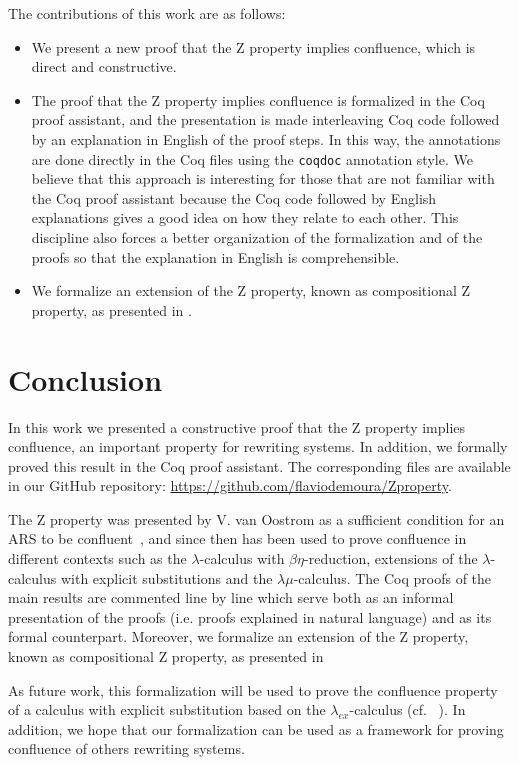 \documentclass{llncs}
\begin{document}
The contributions of this work are as follows:
\begin{itemize}
\item We present a new proof that the Z property implies confluence, which is direct and constructive.
\item The proof that the Z property implies confluence is formalized in the Coq proof assistant\cite{teamCoqProofAssistant2024}, and the presentation is made interleaving Coq code followed by an explanation in English of the proof steps. In this way, the annotations are done directly in the Coq files using the {\tt coqdoc} annotation style. We believe that this approach is interesting for those that are not familiar with the Coq proof assistant because the Coq code followed by English explanations gives a good idea on how they relate to each other. This discipline also forces a better organization of the formalization and of the proofs so that the explanation in English is comprehensible.
\item We formalize an extension of the Z property, known as compositional Z property, as presented in \cite{Nakazawa-Fujita2016}.
\end{itemize}




\section{Conclusion}

In this work we presented a constructive proof that the Z property
implies confluence, an important property for rewriting systems. In
addition, we formally proved this result in the Coq proof
assistant. The corresponding files are available in our GitHub
repository: \url{https://github.com/flaviodemoura/Zproperty}.

The Z property was presented by V. van Oostrom as a sufficient
condition for an ARS to be confluent~\cite{zproperty}, and since
then has been used to prove confluence in different contexts such as
the $\lambda$-calculus with $\beta\eta$-reduction, extensions of the
$\lambda$-calculus with explicit substitutions and the
$\lambda\mu$-calculus. The Coq proofs of the main results are
commented line by line which serve both as an informal presentation of
the proofs (i.e. proofs explained in natural language) and as its
formal counterpart. Moreover, we formalize an extension of the Z
property, known as compositional Z property, as presented in
\cite{Nakazawa-Fujita2016}

As future work, this formalization will be used to prove the
confluence property of a calculus with explicit substitution based on
the $\lambda_{ex}$-calculus (cf. ~\cite{kes09}). In addition, we hope
that our formalization can be used as a framework for proving
confluence of others rewriting systems.



\end{document}
